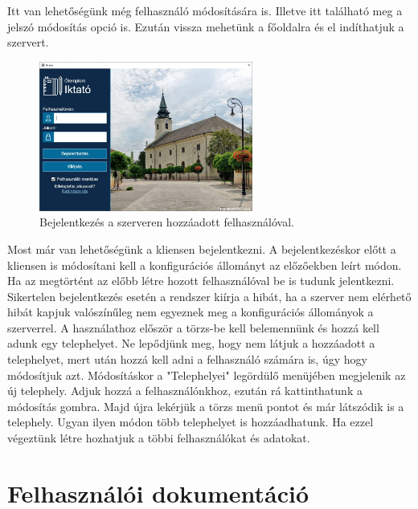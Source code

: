 \documentclass[
]{thesis-ekf}
\theoremstyle{definition}
\theoremstyle{remark}
\begin{document}
Itt van lehetőségünk még felhasználó módosítására is. Illetve itt található meg a jelszó módosítás opció is. Ezután vissza mehetünk a főoldalra és el indíthatjuk a szervert.
\begin{figure}[!h]
	\centering
	\includegraphics[width=7cm]{dokukepek/clogin}
	\caption{Bejelentkezés a szerveren hozzáadott felhasználóval.}
	\label{fig:clogin}
\end{figure} 
Most már van lehetőségünk a kliensen bejelentkezni. A bejelentkezéskor előtt a kliensen is módosítani kell a konfigurációs állományt az előzőekben leírt módon. 
Ha az megtörtént az előbb létre hozott felhasználóval be is tudunk jelentkezni. Sikertelen bejelentkezés esetén a rendszer kiírja a hibát, ha a szerver nem elérhető hibát kapjuk valószínűleg nem egyeznek meg a konfigurációs állományok a szerverrel. A használathoz először a törzs-be kell belemennünk és hozzá kell adunk egy telephelyet. Ne lepődjünk meg, hogy nem látjuk a hozzáadott a telephelyet, mert után hozzá kell adni a felhasználó számára is, úgy hogy módosítjuk azt. Módosításkor a "Telephelyei" legördülő menüjében megjelenik az új telephely. Adjuk hozzá a felhasználónkhoz, ezután rá kattinthatunk a módosítás gombra. Majd újra lekérjük a törzs menü pontot és már látszódik is a telephely. Ugyan ilyen módon több telephelyet is hozzáadhatunk. Ha ezzel végeztünk létre hozhatjuk a többi felhasználókat és adatokat.
\section{Felhasználói dokumentáció}
\end{document}
